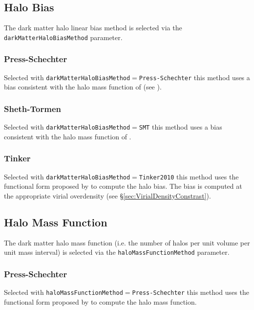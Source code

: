 \subsection{Halo Bias}

The dark matter halo linear bias method is selected via the {\tt darkMatterHaloBiasMethod} parameter.

\subsubsection{Press-Schechter}

Selected with {\tt darkMatterHaloBiasMethod}$=${\tt Press-Schechter} this method uses a bias consistent with the halo mass function of \cite{press_formation_1974} (see \citep{mo_analytic_1996}).

\subsubsection{Sheth-Tormen}

Selected with {\tt darkMatterHaloBiasMethod}$=${\tt SMT} this method uses a bias consistent with the halo mass function of \cite{sheth_ellipsoidal_2001}.

\subsubsection{Tinker}

Selected with {\tt darkMatterHaloBiasMethod}$=${\tt Tinker2010} this method uses the functional form proposed by \cite{tinker_large_2010} to compute the halo bias. The bias is computed at the appropriate virial overdensity (see \S\ref{sec:VirialDensityConstrast}).

\subsection{Halo Mass Function}

The dark matter halo mass function (i.e. the number of halos per unit volume per unit mass interval) is selected via the {\tt haloMassFunctionMethod} parameter.

\subsubsection{Press-Schechter}

Selected with {\tt haloMassFunctionMethod}$=${\tt Press-Schechter} this method uses the functional form proposed by \cite{press_formation_1974} to compute the halo mass function.

